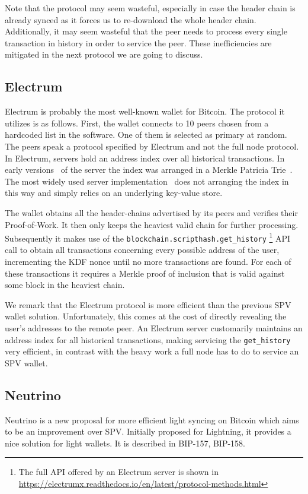 \documentclass[sigconf]{acmart}
\begin{document}
Note that the protocol may seem wasteful, especially in case the header chain is already synced as it forces us to re-download the whole header chain. Additionally, it may seem wasteful that the peer needs to process every single transaction in history in order to service the peer. These inefficiencies are mitigated in the next protocol we are going to discuss.


\subsection{Electrum}
Electrum is probably the most well-known wallet for Bitcoin.
The protocol it utilizes is as follows. First, the wallet connects to 10 peers chosen from a hardcoded list in the software. One of them is selected as primary at random. The peers speak a protocol specified by Electrum and not the full node protocol.
In Electrum, servers hold an address index over all historical transactions. In early versions~\cite{electrumserver} of the server the index was arranged in a Merkle Patricia Trie~\cite{ultimate}. The most widely used server implementation~\cite{electrumserverrust} does not arranging the index in this way and simply relies on an underlying key-value store.

The wallet obtains all the header-chains advertised by its peers and verifies their Proof-of-Work. It then only keeps the heaviest valid chain for further processing. Subsequently it makes use of the \texttt{block\-chain.\allowbreak script\-hash.\allowbreak get\_history}
\footnote{The full API offered by an Electrum server is shown in \url{https://electrumx.readthedocs.io/en/latest/protocol-methods.html}}
API call to obtain all transactions concerning every possible address of the user, incrementing the KDF nonce until no more transactions are found. For each of these transactions it requires a Merkle proof of inclusion that is valid against some block in the heaviest chain.

We remark that the Electrum protocol is more efficient than the previous SPV wallet solution. Unfortunately, this comes at the cost of directly revealing the user's addresses to the remote peer. An Electrum server customarily maintains an address index for all historical transactions, making servicing the \texttt{get\_history} very efficient, in contrast with the heavy work a full node has to do to service an SPV wallet.
\subsection{Neutrino}
Neutrino is a new proposal for more efficient light syncing on Bitcoin which aims to be an improvement over SPV. Initially proposed for Lightning, it provides a nice solution for light wallets. It is described in BIP-157, BIP-158.
\end{document}

